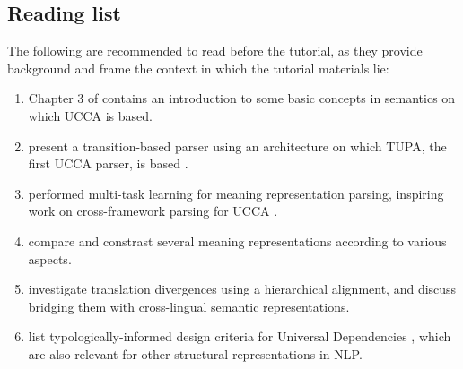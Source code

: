 \documentclass[11pt,a4paper,table]{article}
\begin{document}
\subsection{Reading list}\label{sec:reading}

The following are recommended to read before the tutorial, as
they provide background and frame the context in which the tutorial
materials lie:

\begin{enumerate}
    \item Chapter 3 of  contains an introduction
    to some basic concepts in semantics on which UCCA is based.
    \item {} present a
    transition-based parser using an architecture on which TUPA, the first
    UCCA parser, is based \cite{hershcovich2017a}.
    \item {} performed multi-task learning for
    meaning representation parsing, inspiring work on cross-framework
    parsing for UCCA \cite{hershcovich2018multitask}.
    \item {} compare and constrast several meaning
    representations according to various aspects.
    \item {} investigate translation divergences
    using a hierarchical alignment,
    and discuss bridging them with cross-lingual semantic representations.
    \item {} list typologically-informed design 
    criteria for Universal Dependencies \citep{nivre-etal-2020-universal},
    which are also relevant for other structural representations in NLP.
\end{enumerate}
\end{document}
